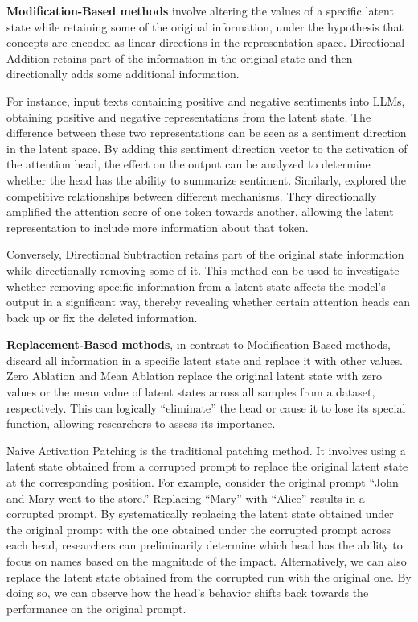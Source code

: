 \documentclass[12pt,letterpaper]{article}
\begin{document}
\textbf{Modification-Based methods} involve altering the values of a specific latent state while retaining some of the original information, under the hypothesis that concepts are encoded as linear directions in the representation space.\citep{LinearRepresent_24_PMLR_UChicago}
Directional Addition retains part of the information in the original state and then directionally adds some additional information.

For instance, \citet{Sentiment_23_arXiv_EleutherAI} input texts containing positive and negative sentiments into LLMs, obtaining positive and negative representations from the latent state. The difference between these two representations can be seen as a sentiment direction in the latent space. By adding this sentiment direction vector to the activation of the attention head, the effect on the output can be analyzed to determine whether the head has the ability to summarize sentiment.
Similarly, \citet{MechanCompet_24_ACL_ETH} explored the competitive relationships between different mechanisms. They directionally amplified the attention score of one token towards another, allowing the latent representation to include more information about that token.

Conversely, Directional Subtraction retains part of the original state information while directionally removing some of it.\citep{SurveyCTG_24_arXiv_RUC} This method can be used to investigate whether removing specific information from a latent state affects the model's output in a significant way, thereby revealing whether certain attention heads can back up or fix the deleted information.

\textbf{Replacement-Based methods}, in contrast to Modification-Based methods, discard all information in a specific latent state and replace it with other values.
Zero Ablation and Mean Ablation replace the original latent state with zero values or the mean value of latent states across all samples from a dataset, respectively. This can logically ``eliminate'' the head or cause it to lose its special function, allowing researchers to assess its importance.

Naive Activation Patching is the traditional patching method. It involves using a latent state obtained from a corrupted prompt to replace the original latent state at the corresponding position. For example, consider the original prompt ``John and Mary went to the store.'' Replacing ``Mary'' with ``Alice'' results in a corrupted prompt. By systematically replacing the latent state obtained under the original prompt with the one obtained under the corrupted prompt across each head, researchers can preliminarily determine which head has the ability to focus on names based on the magnitude of the impact.\citep{ActivationPatching_24_arXiv_Google, ActivationPatching_24_ICLR_Google}
Alternatively, we can also replace the latent state obtained from the corrupted run with the original one. By doing so, we can observe how the head's behavior shifts back towards the performance on the original prompt.
\end{document}
